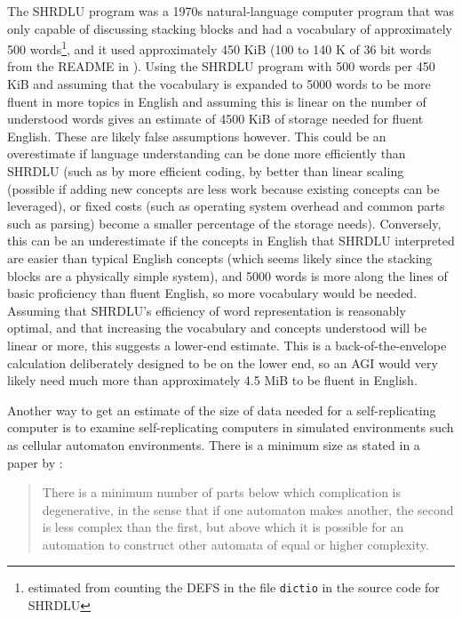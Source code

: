 \documentclass[letterpaper,twocolumn]{article}
\begin{document}
The SHRDLU program was a 1970s natural-language computer program that
was only capable of discussing stacking blocks and had a vocabulary of
approximately 500 words\footnote{estimated from counting the DEFS in
the file {\texttt{dictio}} in the source code for SHRDLU}, and it used
approximately 450 KiB (100 to 140 K of 36 bit words from the README in
\cite{shrdlucode}).  Using the SHRDLU program with 500 words per 450
KiB and assuming that the vocabulary is expanded to 5000 words to be
more fluent in more topics in English and assuming this is linear on
the number of understood words gives an estimate of 4500 KiB of
storage needed for fluent English. These are likely false assumptions
however. This could be an overestimate if language understanding can
be done more efficiently than SHRDLU (such as by more efficient
coding, by better than linear scaling (possible if adding new concepts
are less work because existing concepts can be leveraged), or fixed
costs (such as operating system overhead and common parts such as
parsing) become a smaller percentage of the storage needs).
Conversely, this can be an underestimate if the concepts in English
that SHRDLU interpreted are easier than typical English concepts
(which seems likely since the stacking blocks are a physically simple
system), and 5000 words is more along the lines of basic proficiency
than fluent English, so more vocabulary would be needed. Assuming that
SHRDLU's efficiency of word representation is reasonably
optimal, and that increasing the vocabulary and concepts understood
will be linear or more, this suggests a lower-end estimate. This is a
back-of-the-envelope calculation deliberately designed to be on the
lower end, so an AGI would very likely need much more than
approximately 4.5 MiB to be fluent in English.

Another way to get an estimate of the size of data needed for a self-replicating computer is to examine self-replicating computers in
simulated environments such as cellular automaton environments. There
is a minimum size as stated in a paper by \cite{vonneumannselfreproducing}:

\begin{quote}
  There is a minimum number of parts below which complication is degenerative, in the sense that if one automaton makes another, the second is less complex than the first, but above which it is possible for an automation to construct other automata of equal or higher complexity.
\end{quote}
\end{document}
